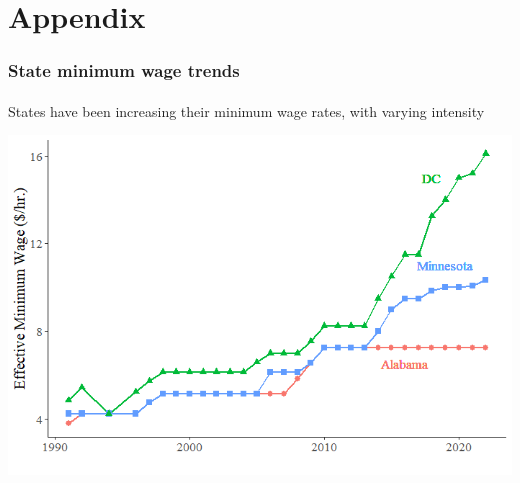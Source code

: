 
\section{Appendix}

\begin{frame}

    \label{min_wage_plot}
    
    \frametitle{State minimum wage trends} %
    \framesubtitle{}  %
    \rmfamily %
    
    \begin{wideitemize}
        \item States have been increasing their \textcolor{fblu}{minimum wage rates}, with varying intensity
    \end{wideitemize}

    \begin{center}
        \includegraphics[scale=0.5]{min_wage_plot_simp.png}
    \end{center}
    
    \hyperlink{main_idea}{}
    
\end{frame}

